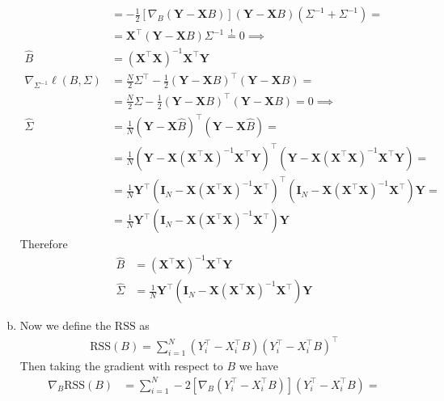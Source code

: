 \documentclass[10pt,notitlepage]{article}
\newcommand{\Xv}{\mathbf{X}}
\newcommand{\Yv}{\mathbf{Y}}
\newcommand{\Id}{\mathbf{I}}
\begin{document}
\begin{exercise}[Solution]
\begin{enumerate}[(a)]
\begin{align*}
                        &= -\frac{1}{2}\left[\nabla_B\left(\Yv-\Xv B\right)\right] \left(\Yv-\Xv B\right)\left(\Sigma^{-1}+\Sigma^{-1}\right) = \\
                        &= \Xv^\top\left(\Yv-\Xv B\right)\Sigma^{-1} \overset{!}{=} 0 \implies \\
                        \hat{B} &= \left(\Xv^\top\Xv\right)^{-1}\Xv^\top\Yv\\
                        \nabla_{\Sigma^{-1}} \ell\left(B,\Sigma\right) &= \frac{N}{2} \Sigma ^\top -\frac{1}{2} \left(\Yv-\Xv B\right)^\top\left(\Yv-\Xv B\right) = \\
                        &=\frac{N}{2} \Sigma -\frac{1}{2} \left(\Yv-\Xv B\right)^\top\left(\Yv-\Xv B\right) = 0\implies\\
                        \hat{\Sigma} &= \frac{1}{N}\left(\Yv-\Xv \hat{B}\right)^\top\left(\Yv-\Xv \hat{B}\right) = \\
                        &= \frac{1}{N}\left(\Yv-\Xv \left(\Xv^\top\Xv\right)^{-1}\Xv^\top\Yv\right)^\top\left(\Yv-\Xv \left(\Xv^\top\Xv\right)^{-1}\Xv^\top\Yv\right) = \\
                        &= \frac{1}{N}\Yv^\top \left(\Id_N - \Xv \left(\Xv^\top\Xv\right)^{-1}\Xv^\top\right)^\top\left(\Id_N - \Xv \left(\Xv^\top\Xv\right)^{-1}\Xv^\top\right)\Yv = \\
                        &= \frac{1}{N}\Yv^\top \left(\Id_N - \Xv \left(\Xv^\top\Xv\right)^{-1}\Xv^\top\right)\Yv
                    \end{align*}
                    Therefore
                    \begin{align*}
                        \hat{B} &= \left(\Xv^\top\Xv\right)^{-1}\Xv^\top\Yv\\
                        \hat{\Sigma} &= \frac{1}{N}\Yv^\top \left(\Id_N - \Xv \left(\Xv^\top\Xv\right)^{-1}\Xv^\top\right)\Yv
                    \end{align*}
            \item Now we define the $\text{RSS}$ as 
                    \begin{align*}
                        \text{RSS}(B) = \sum_{i=1}^{N} \left(Y_i^\top - X_i^\top B\right)\left(Y_i^\top - X_i^\top B\right)^\top
                    \end{align*}
                    Then taking the gradient with respect to $B$ we have
                    \begin{align*}
                        \nabla_B\text{RSS}(B) &= \sum_{i=1}^{N}-2\left[\nabla_B\left(Y_i^\top - X_i^\top B\right)\right]\left(Y_i^\top - X_i^\top B\right) = \\

\end{align*}
\end{enumerate}
\end{exercise}
\end{document}
